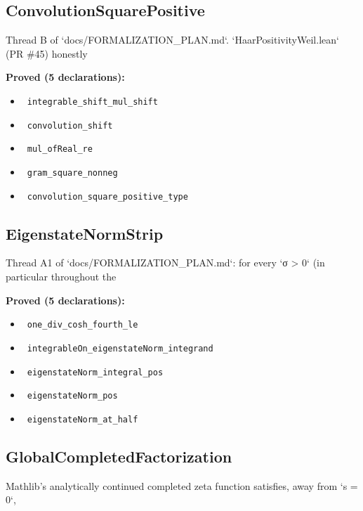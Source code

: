 \documentclass{report}
\theoremstyle{definition}
\begin{document}
\subsection{ConvolutionSquarePositive}
Thread B of `docs/FORMALIZATION\_PLAN.md`. `HaarPositivityWeil.lean` (PR \#45) honestly

\noindent\textbf{Proved (5 declarations):}
\begin{itemize}
  \item {}\leanok\ \texttt{integrable\_shift\_mul\_shift}
  \item {}\leanok\ \texttt{convolution\_shift}
  \item {}\leanok\ \texttt{mul\_ofReal\_re}
  \item {}\leanok\ \texttt{gram\_square\_nonneg}
  \item {}\leanok\ \texttt{convolution\_square\_positive\_type}
\end{itemize}

\subsection{EigenstateNormStrip}
Thread A1 of `docs/FORMALIZATION\_PLAN.md`: for every `σ > 0` (in particular throughout the

\noindent\textbf{Proved (5 declarations):}
\begin{itemize}
  \item {}\leanok\ \texttt{one\_div\_cosh\_fourth\_le}
  \item {}\leanok\ \texttt{integrableOn\_eigenstateNorm\_integrand}
  \item {}\leanok\ \texttt{eigenstateNorm\_integral\_pos}
  \item {}\leanok\ \texttt{eigenstateNorm\_pos}
  \item {}\leanok\ \texttt{eigenstateNorm\_at\_half}
\end{itemize}

\subsection{GlobalCompletedFactorization}
Mathlib's analytically continued completed zeta function satisfies, away from `s = 0`,
\end{document}
